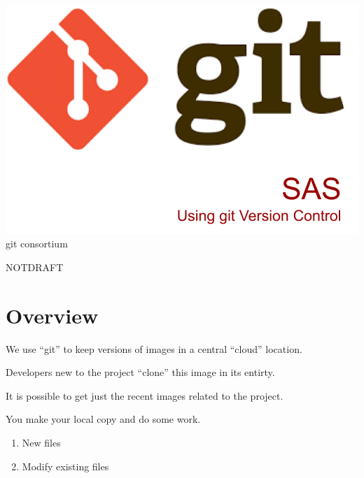 \documentclass[letter,11pt,oneside]{article}
\def\documentisdraft{NOTDRAFT}
\begin{document}

\pagecolor{blue!50}

\includegraphics[width=.9\textwidth]{images/SASGitTitle.png} \\
\vskip 1mm {\tiny git consortium}



\newpage
\pagecolor{white}


\setcounter{section}{0}

\ifx\documentisdraft\drafttest
\linenumbers    %
\fi

\newpage

\section*{Overview}

We use ``git'' to keep versions of images in a central ``cloud'' location.

Developers new to the project ``clone'' this image in its entirty.

It is possible to get just the recent images related to the project.

You make your local copy and do some work.
\vspace{-.15cm}
\begin{enumerate}\addtolength{\itemsep}{-0.5\baselineskip}
   \item   New files
   \item   Modify existing files
\end{enumerate}
\end{document}
